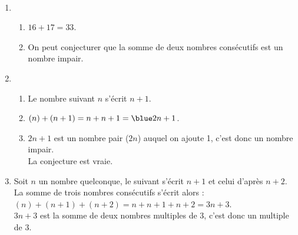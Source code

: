 \ \\ [-5mm]
   \begin{enumerate}
      \item
         \begin{enumerate}
            \item {\blue $16+17 =33$}.
            \item On peut conjecturer que  {\blue la somme de deux nombres consécutifs est un nombre impair}.
         \end{enumerate}
      \setcounter{enumi}{1}
      \item
         \begin{enumerate}
            \item Le nombre suivant $n$ s'écrit {\blue $n+1$}.
            \item $(n)+(n+1) =n+n+1 ={\blue 2n+1}$.
            \item $2n+1$ est un nombre pair ($2n$) auquel on ajoute 1, c'est donc un nombre impair. \\
               {\blue La conjecture est vraie}.
         \end{enumerate}
      \setcounter{enumi}{2}
      \item Soit $n$ un nombre quelconque, le suivant s'écrit $n+1$ et celui d'après $n+2$. \\
         La somme de trois nombres consécutifs s'écrit alors : \\
         $(n)+(n+1)+(n+2) =n+n+1+n+2 =3n+3$. \\
         $3n+3$ est la somme de deux nombres multiples de 3, {\blue c'est donc un multiple de 3}.
   \end{enumerate}
